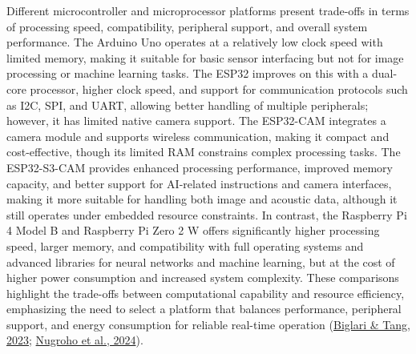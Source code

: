 \begin{thesisprose}
\begin{itemize}
Different microcontroller and microprocessor platforms present trade-offs in terms of processing speed, compatibility, peripheral support, and overall system performance. The Arduino Uno operates at a relatively low clock speed with limited memory, making it suitable for basic sensor interfacing but not for image processing or machine learning tasks. The ESP32 improves on this with a dual-core processor, higher clock speed, and support for communication protocols such as I2C, SPI, and UART, allowing better handling of multiple peripherals; however, it has limited native camera support. The ESP32-CAM integrates a camera module and supports wireless communication, making it compact and cost-effective, though its limited RAM constrains complex processing tasks. The ESP32-S3-CAM provides enhanced processing performance, improved memory capacity, and better support for AI-related instructions and camera interfaces, making it more suitable for handling both image and acoustic data, although it still operates under embedded resource constraints. In contrast, the Raspberry Pi 4 Model B and Raspberry Pi Zero 2 W offers significantly higher processing speed, larger memory, and compatibility with full operating systems and advanced libraries for neural networks and machine learning, but at the cost of higher power consumption and increased system complexity. These comparisons highlight the trade-offs between computational capability and resource efficiency, emphasizing the need to select a platform that balances performance, peripheral support, and energy consumption for reliable real-time operation (\hyperlink{cite.biglari2023}{Biglari \& Tang, 2023}; \hyperlink{cite.nugroho2024}{Nugroho et al., 2024}).

\end{itemize}




\end{thesisprose}
